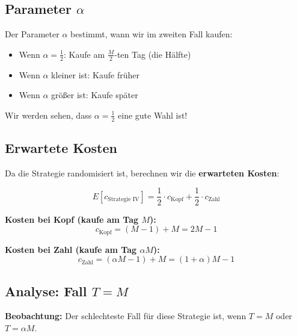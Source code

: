 \documentclass[12pt,a4paper]{article}
\theoremstyle{definition}
\begin{document}
\subsection{Parameter $\alpha$}

Der Parameter $\alpha$ bestimmt, wann wir im zweiten Fall kaufen:
\begin{itemize}
    \item Wenn $\alpha = \frac{1}{2}$: Kaufe am $\frac{M}{2}$-ten Tag (die Hälfte)
    \item Wenn $\alpha$ kleiner ist: Kaufe früher
    \item Wenn $\alpha$ größer ist: Kaufe später
\end{itemize}

Wir werden sehen, dass $\alpha = \frac{1}{2}$ eine gute Wahl ist!

\subsection{Erwartete Kosten}

Da die Strategie randomisiert ist, berechnen wir die \textbf{erwarteten Kosten}:

\[
E[c_{\text{Strategie IV}}] = \frac{1}{2} \cdot c_{\text{Kopf}} + \frac{1}{2} \cdot c_{\text{Zahl}}
\]

\textbf{Kosten bei Kopf (kaufe am Tag $M$):}
\[
c_{\text{Kopf}} = (M-1) + M = 2M - 1
\]

\textbf{Kosten bei Zahl (kaufe am Tag $\alpha M$):}
\[
c_{\text{Zahl}} = (\alpha M - 1) + M = (1+\alpha)M - 1
\]

\subsection{Analyse: Fall $T = M$}

\textbf{Beobachtung:} Der schlechteste Fall für diese Strategie ist, wenn $T = M$ oder $T = \alpha M$.
\end{document}
